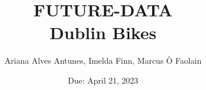 \documentclass[12pt,letterpaper]{article}
\title{FUTURE-DATA\\Dublin Bikes}
\date{Due: April 21, 2023}
\author{Ariana Alves Antunes, Imelda Finn, Marcus Ò Faolain}
\begin{document}
	\maketitle
\begin{comment}
\section*{Instructions}
Scenario: You are working for FUTURE-DATA a local company specialised in data science. Dublin City
Council hired your company to study the impact of COVID-19 on the city-bikes usage as they are
planning to optimise the city-bike system. Dublin City Council had originally structured the city-bike
network based on the forecasts of bike usage up to 2030. However, they think that the usage may not
match the initial prediction because of the impact of the pandemic on our mobility. FUTURE-DATA
decided to investigate this rapidly and by formulating multiple scenarios that should be considered by
the City Council. To do so, they assigned the task to k small teams or machine learning and smart and
sustainable cities experts. You are part of one of these k teams.
Task: The company proposed 3 goals. Pick 2 out of the following 3 tasks (two tasks correctly carried
out will give you full points; an extra task will not give any extra points).
1. To assess the impact of the pandemic on the city-bike usage;
2. To estimate how the city-bike usage would have been without the pandemic (e.g., 2020);
3. To predict the city-bike usage for 2022 in both the pandemic and no-pandemic scenarios. Use
both qualitative and quantitative comparisons.
The manager suggested focussing on two or three strategically placed bike stations (of course, you are
free to do more than that, if you like). Make sure that the data for that bike station is available on all
the datasets. Missing or bad data-points can be a problem. So, identifying stations with good data will
make your life easier (but feel free to make your life more complicated if you like the challenge).
Suggestion: The original features tell us about bike and bike stand availability. However, that is a
different concept from “bike usage”. The optimal approach involves deriving a new feature
quantifying the “bike usage” in a given station. Other ways of tackling the tasks are also accepted, but
remember to justify your choices and to plot clear, compact figures


	Submission:
	- A brief report (~2 pages including figures, max 3 pages) with text answering the three
	questions above, and figures (e.g., bar plots) or tables showing the results and data supporting
	your considerations. Remember: You are planning to present this report to your manages AND
	to Dublin City Council. As such, figures must be easy to understand (e.g., large font size, brief
	but meaningful axis labels, include a short caption describing each figure).
	- Your Python scripts. Please write them well, with comments so that I can understand what
	you did. I will use the scripts to double-check your results where necessary.
	- Submission deadline: 21 April 2023.
	- Late submission penalty: 5%

\end{comment}
\end{document}
